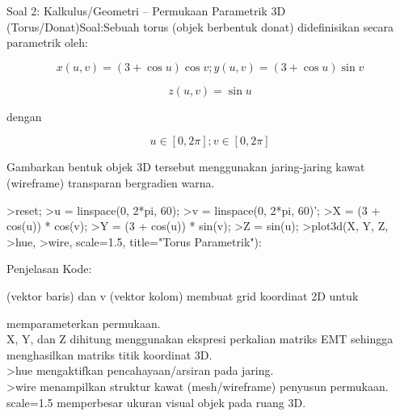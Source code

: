 \documentclass[a4paper,10pt]{article}
\begin{document}
\begin{eulernotebook}
\begin{eulercomment}
\begin{eulercomment}
\begin{eulercomment}
Soal 2: Kalkulus/Geometri – Permukaan Parametrik 3D
(Torus/Donat)Soal:Sebuah torus (objek berbentuk donat) didefinisikan
secara parametrik oleh:\\
\end{eulercomment}
\begin{eulerformula}
\[
x(u,v) = (3 + \cos u) \cos v ; y(u,v) = (3 + \cos u) \sin v
\]
\end{eulerformula}
\begin{eulerformula}
\[
z(u,v) = \sin u
\]
\end{eulerformula}
\begin{eulercomment}
dengan\\
\end{eulercomment}
\begin{eulerformula}
\[
u \in [0, 2\pi] ; v \in [0, 2\pi]
\]
\end{eulerformula}
\begin{eulercomment}
Gambarkan bentuk objek 3D tersebut menggunakan jaring-jaring kawat
(wireframe) transparan bergradien warna.
\end{eulercomment}
\begin{eulerprompt}
>reset;
>u = linspace(0, 2*pi, 60);
>v = linspace(0, 2*pi, 60)';
>X = (3 + cos(u)) * cos(v);
>Y = (3 + cos(u)) * sin(v);
>Z = sin(u);
>plot3d(X, Y, Z, >hue, >wire, scale=1.5, title="Torus Parametrik"):
\end{eulerprompt}
\begin{eulercomment}
Penjelasan Kode:\\
\end{eulercomment}
\begin{eulerttcomment}
 (vektor baris) dan v (vektor kolom) membuat grid koordinat 2D untuk
\end{eulerttcomment}
\begin{eulercomment}
memparameterkan permukaan.\\
X, Y, dan Z dihitung menggunakan ekspresi perkalian matriks EMT
sehingga menghasilkan matriks titik koordinat 3D.\\
\textgreater{}hue mengaktifkan pencahayaan/arsiran pada jaring.\\
\textgreater{}wire menampilkan struktur kawat (mesh/wireframe) penyusun permukaan.\\
scale=1.5 memperbesar ukuran visual objek pada ruang 3D.


\end{eulercomment}
\end{eulercomment}
\end{eulercomment}
\end{eulernotebook}
\end{document}
